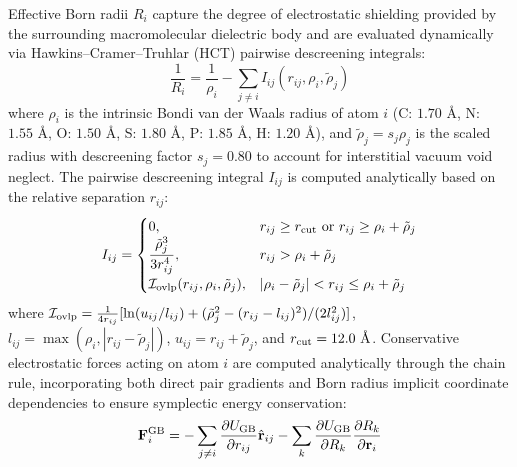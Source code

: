 \documentclass[journal=jpcbfk,manuscript=article,layout=twocolumn]{achemso}
\begin{document}
Effective Born radii $R_i$ capture the degree of electrostatic shielding provided by the surrounding macromolecular dielectric body and are evaluated dynamically via Hawkins--Cramer--Truhlar (HCT) pairwise descreening integrals:\cite{hawkins1996parameterized,onufriev2004exploring}
\begin{equation}
\frac{1}{R_i} = \frac{1}{\rho_i} - \sum_{j \neq i} I_{ij}(r_{ij}, \rho_i, \tilde{\rho}_j)
\end{equation}
where $\rho_i$ is the intrinsic Bondi van der Waals radius of atom $i$ (C: $1.70\text{ \AA}$, N: $1.55\text{ \AA}$, O: $1.50\text{ \AA}$, S: $1.80\text{ \AA}$, P: $1.85\text{ \AA}$, H: $1.20\text{ \AA}$), and $\tilde{\rho}_j = s_j \rho_j$ is the scaled radius with descreening factor $s_j = 0.80$ to account for interstitial vacuum void neglect. The pairwise descreening integral $I_{ij}$ is computed analytically based on the relative separation $r_{ij}$:
\begin{equation}
I_{ij} = 
\begin{cases}
0, & r_{ij} \ge r_{\rm cut} \text{ or } r_{ij} \ge \rho_i + \tilde{\rho}_j \\
\dfrac{\tilde{\rho}_j^3}{3 r_{ij}^4}, & r_{ij} > \rho_i + \tilde{\rho}_j \\
\mathcal{I}_{\rm ovlp}(r_{ij}, \rho_i, \tilde{\rho}_j), & |\rho_i - \tilde{\rho}_j| < r_{ij} \le \rho_i + \tilde{\rho}_j
\end{cases}
\end{equation}
where $\mathcal{I}_{\rm ovlp} = \frac{1}{4 r_{ij}} [ \ln( u_{ij} / l_{ij} ) + (\tilde{\rho}_j^2 - (r_{ij} - l_{ij})^2)/(2 l_{ij}^2) ]$, $l_{ij} = \max(\rho_i, |r_{ij} - \tilde{\rho}_j|)$, $u_{ij} = r_{ij} + \tilde{\rho}_j$, and $r_{\rm cut} = 12.0\text{ \AA}$. Conservative electrostatic forces acting on atom $i$ are computed analytically through the chain rule, incorporating both direct pair gradients and Born radius implicit coordinate dependencies to ensure symplectic energy conservation:
\begin{equation}
\mathbf{F}_i^{\rm GB} = - \sum_{j \neq i} \frac{\partial U_{\rm GB}}{\partial r_{ij}} \hat{\mathbf{r}}_{ij} - \sum_{k} \frac{\partial U_{\rm GB}}{\partial R_k} \frac{\partial R_k}{\partial \mathbf{r}_i}
\end{equation}
\end{document}
